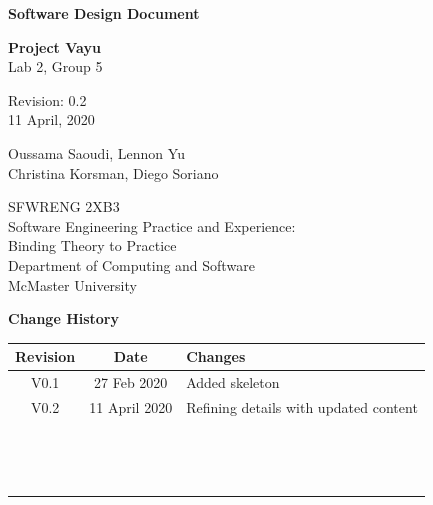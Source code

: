 \documentclass[12pt]{article}
\begin{document}
\begin{titlepage}
    \begin{center}
        \vspace*{1cm}
            
        \Huge
        \textbf{Software Design Document}
 
        \LARGE
        \vspace{0.5cm}
        \textbf{Project Vayu}\\
        \vspace{0.2cm}
        Lab 2, Group 5
 
        \vspace{0.5cm}
        Revision: 0.2\\
        \vspace{0.2cm}
        11 April, 2020
            
        \vspace{1.5cm}
            
        \Large
        Oussama Saoudi, Lennon Yu\\
        Christina Korsman, Diego Soriano
 
        \vfill
            
        \vspace{0.8cm}
                        
        \large
        SFWRENG 2XB3\\
        Software Engineering Practice and Experience:\\
        Binding Theory to Practice\\
        Department of Computing and Software\\
        McMaster University            
    \end{center}
\end{titlepage}
 
\newpage
\Large \noindent \textbf{Change History}\\
\normalsize
\begin{center}
    \begin{tabular}{|| c | c | p{7cm} ||} 
    \hline
    Revision & Date & Changes\\
    \hline\hline
    V0.1 & 27 Feb 2020 & Added skeleton \\ 
    \hline
    V0.2 & 11 April 2020 & Refining details with updated content \\
    \hline
    ~ & ~ & ~ \\
    \hline
    ~ & ~ & ~ \\
    \hline
    ~ & ~ & ~ \\
    \hline
\end{tabular}
\end{center}
 
\end{document}
